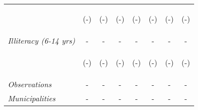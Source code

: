 \begin{tabular}{lccccccc}
\vspace{4pt} & \begin{footnotesize}(-)\end{footnotesize} &  \begin{footnotesize}(-)\end{footnotesize}  &  \begin{footnotesize}(-)\end{footnotesize}    &   \begin{footnotesize}(-)\end{footnotesize}   &   \begin{footnotesize}(-)\end{footnotesize}  &  \begin{footnotesize}(-)\end{footnotesize} &  \begin{footnotesize}(-)\end{footnotesize} \\          



\textit{Illiteracy (6-14 yrs)}          		  &  -    &    -   &     -  &  -  &     -  & -   &  -    \\

\vspace{4pt} & \begin{footnotesize}(-)\end{footnotesize} &  \begin{footnotesize}(-)\end{footnotesize}  &  \begin{footnotesize}(-)\end{footnotesize}    &   \begin{footnotesize}(-)\end{footnotesize}   &   \begin{footnotesize}(-)\end{footnotesize}  &  \begin{footnotesize}(-)\end{footnotesize} &  \begin{footnotesize}(-)\end{footnotesize} \\                   


\hline		
\hline		


\textit{Observations}                 &   -    &    -      &  -     & -   &	 -   &	  -  &	  -   	\\
\textit{Municipalities}               &   -   &    -     &  -    & -  &  -  &	  - &	  -  	\\
\hline		
\hline		



\end{tabular}
